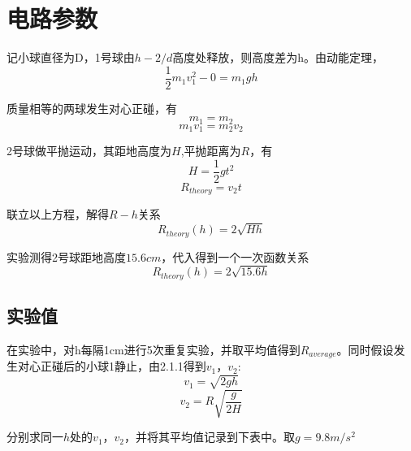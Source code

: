 \section{电路参数}
记小球直径为D，1号球由$h-2/d$高度处释放，则高度差为h。由动能定理，
\begin{equation}
	\frac{1}{2}  m_{1} v_{1}^{2} - 0 = m_{1 }g h
\end{equation}
\par
质量相等的两球发生对心正碰，有
\begin{equation}
	m_{1} = m_{2}
\end{equation}
\begin{equation}
	m_{1} v_{1} = m_{2} v_{2}
\end{equation}
\par
2号球做平抛运动，其距地高度为$H$,平抛距离为$R$，有
\begin{equation}
	H = \frac{1}{2} g t^{2}
\end{equation}
\begin{equation}
	R_{theory} = v_{2} t
\end{equation}
\par 
联立以上方程，解得$R-h$关系
\begin{equation}
	R_{theory} (h) = 2 \sqrt{Hh}
\end{equation}
\par
实验测得2号球距地高度$15.6cm$，代入得到一个一次函数关系
\begin{equation}
	R_{theory} (h) = 2 \sqrt{15.6 h}
\end{equation}

\subsection{实验值}
在实验中，对h每隔1cm进行5次重复实验，并取平均值得到$R_{average}$。同时假设发生对心正碰后的小球1静止，由2.1.1得到$v_{1}$，$v_{2}$:
\begin{equation}
	v_{1} = \sqrt{2gh}
\end{equation}
\begin{equation}
	v_{2} = R \sqrt{\frac{g}{2H}}
\end{equation}

分别求同一$h$处的$v_{1}$，$v_{2}$，并将其平均值记录到下表中。取$g = 9.8 m/s^{2}$


